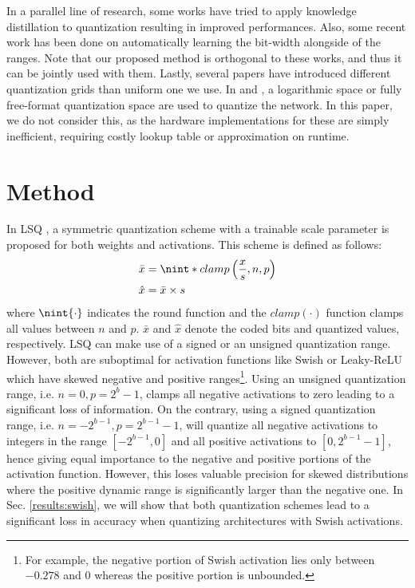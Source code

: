 \documentclass[10pt,twocolumn,letterpaper]{article}
\DeclarePairedDelimiter{\nint}\lfloor\rceil
\begin{document}
In a parallel line of research, some works \cite{qkd,mishra2017apprentice,polino2018model} have tried to apply knowledge distillation to quantization resulting in improved performances. Also, some recent work \cite{dq2020} has been done on automatically learning the bit-width alongside of the ranges. Note that our proposed method is orthogonal to these works, and thus it can be jointly used with them. Lastly, several papers have introduced different quantization grids than uniform one we use. In \cite{miyashita2016convlog} and \cite{ullrich2018}, a logarithmic space or fully free-format quantization space are used to quantize the network. In this paper, we do not consider this, as the hardware implementations for these are simply inefficient, requiring costly lookup table or approximation on runtime.

\section{Method}
\label{sec:method}
In LSQ \cite{lsq}, a symmetric quantization scheme with a trainable scale parameter is proposed for both weights and activations. This scheme is defined as follows:
\begin{align}
\begin{split}
    \bar{x} &= \nint*{clamp\left(\frac{x}{s}, n, p\right)} \\
    \hat{x} &= \bar{x}\times s
\end{split}
\label{eq:symm}
\end{align}
where $\nint{\cdot}$ indicates the round function and the $clamp(\cdot)$ function clamps all values between $n$ and $p$. $\bar{x}$ and $\hat{x}$ denote the coded bits and quantized values, respectively. 
LSQ can make use of a signed or an unsigned quantization range. However, both are suboptimal for activation functions like Swish or Leaky-ReLU which have skewed negative and positive ranges\footnote{For example, the negative portion of Swish activation lies only between $-0.278$ and $0$ whereas the positive portion is unbounded.}. 
Using an unsigned quantization range, i.e. $n=0, p=2^{b}-1$, clamps all negative activations to zero leading to a significant loss of information. 
On the contrary, using a signed quantization range, i.e. $n=-2^{b-1}, p=2^{b-1}-1$, will quantize all negative activations to integers in the range $[-2^{b-1},0]$ and all positive activations to $[0,2^{b-1}-1]$, hence giving equal importance to the negative and positive portions of the activation function. 
However, this loses valuable precision for skewed distributions where the positive dynamic range is significantly larger than the negative one. In Sec. \ref{results:swish}, we will show that both quantization schemes lead to a significant loss in accuracy when quantizing architectures with Swish activations.
\end{document}
